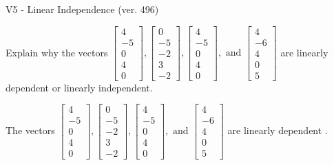 \begin{exercise}
  \begin{exerciseTitle}V5 - Linear Independence (ver. 496)\end{exerciseTitle}
  \begin{exerciseStatement}
    Explain why the vectors \(\left[\begin{array}{r}
4 \\
-5 \\
0 \\
4 \\
0
\end{array}\right] , \left[\begin{array}{r}
0 \\
-5 \\
-2 \\
3 \\
-2
\end{array}\right] , \left[\begin{array}{r}
4 \\
-5 \\
0 \\
4 \\
0
\end{array}\right] , \text{ and } \left[\begin{array}{r}
4 \\
-6 \\
4 \\
0 \\
5
\end{array}\right]\) are linearly dependent or linearly independent.	


  \end{exerciseStatement}
  \begin{exerciseAnswer}
   The vectors \(\left[\begin{array}{r}
4 \\
-5 \\
0 \\
4 \\
0
\end{array}\right] , \left[\begin{array}{r}
0 \\
-5 \\
-2 \\
3 \\
-2
\end{array}\right] , \left[\begin{array}{r}
4 \\
-5 \\
0 \\
4 \\
0
\end{array}\right] , \text{ and } \left[\begin{array}{r}
4 \\
-6 \\
4 \\
0 \\
5
\end{array}\right]\) are 
  	 linearly dependent  .
  


  \end{exerciseAnswer}
\end{exercise}